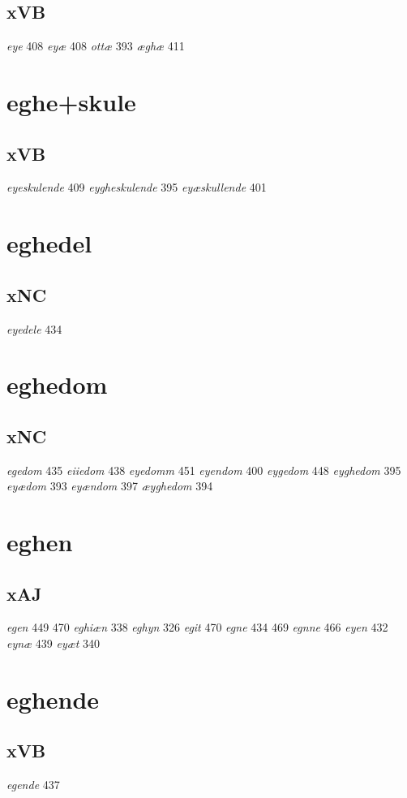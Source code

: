\documentclass[a4paper,twocolumn]{article}
\begin{document}
\subsection{xVB}
\label{sec:org88e1d1c}
\emph{eye} 408 \emph{eyæ} 408 \emph{ottæ} 393 \emph{æghæ} 411 
\section{eghe+skule}
\label{sec:orgcb1c6c3}
\subsection{xVB}
\label{sec:org9451820}
\emph{eyeskulende} 409 \emph{eygheskulende} 395 \emph{eyæskullende} 401 
\section{eghedel}
\label{sec:orgd4efdfb}
\subsection{xNC}
\label{sec:org0983fda}
\emph{eyedele} 434 
\section{eghedom}
\label{sec:org6c9f434}
\subsection{xNC}
\label{sec:org17f6926}
\emph{egedom} 435 \emph{eiiedom} 438 \emph{eyedomm} 451 \emph{eyendom} 400 \emph{eygedom} 448 \emph{eyghedom} 395 \emph{eyædom} 393 \emph{eyændom} 397 \emph{æyghedom} 394 
\section{eghen}
\label{sec:org3ee494f}
\subsection{xAJ}
\label{sec:orgc13ce22}
\emph{egen} 449 470 \emph{eghiæn} 338 \emph{eghyn} 326 \emph{egit} 470 \emph{egne} 434 469 \emph{egnne} 466 \emph{eyen} 432 \emph{eynæ} 439 \emph{eyæt} 340 
\section{eghende}
\label{sec:org7ff401a}
\subsection{xVB}
\label{sec:org6114bea}
\emph{egende} 437 
\end{document}
